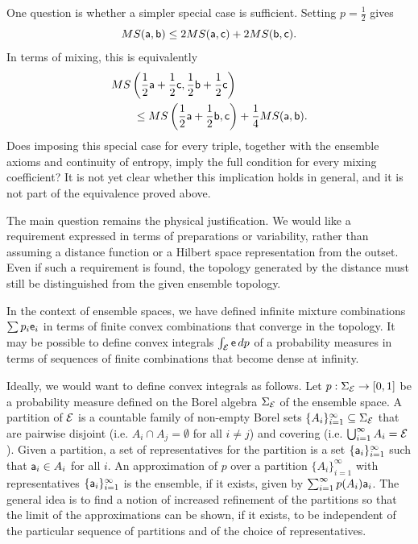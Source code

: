 One question is whether a simpler special case is sufficient. Setting $p=\frac{1}{2}$ gives
\begin{equation}
	MS(\ens[a],\ens[b])\leq2MS(\ens[a],\ens[c])+2MS(\ens[b],\ens[c]).
\end{equation}
In terms of mixing, this is equivalently
\begin{equation}
	\begin{aligned}
		&MS\left(\frac{1}{2}\ens[a]+\frac{1}{2}\ens[c],\frac{1}{2}\ens[b]+\frac{1}{2}\ens[c]\right)\\
		&\qquad\leq MS\left(\frac{1}{2}\ens[a]+\frac{1}{2}\ens[b],\ens[c]\right)+\frac{1}{4}MS(\ens[a],\ens[b]).
	\end{aligned}
\end{equation}
Does imposing this special case for every triple, together with the ensemble axioms and continuity of entropy, imply the full condition for every mixing coefficient? It is not yet clear whether this implication holds in general, and it is not part of the equivalence proved above.

The main question remains the physical justification. We would like a requirement expressed in terms of preparations or variability, rather than assuming a distance function or a Hilbert space representation from the outset. Even if such a requirement is found, the topology generated by the distance must still be distinguished from the given ensemble topology.

{In the context of ensemble spaces, we have defined infinite mixture combinations $\sum p_i \ens_i$ in terms of finite convex combinations that converge in the topology. It may be possible to define convex integrals $\int_{\Ens} \ens \, dp$ of a probability measures in terms of sequences of finite combinations that become dense at infinity.}

Ideally, we would want to define convex integrals as follows. Let $p : \Sigma_{\Ens} \to [0,1]$ be a probability measure defined on the Borel algebra $\Sigma_{\Ens}$ of the ensemble space. A partition of $\Ens$ is a countable family of non-empty Borel sets $\{A_i\}_{i=1}^{\infty} \subseteq \Sigma_{\Ens}$ that are pairwise disjoint (i.e. $A_i \cap A_j = \emptyset$ for all $i \neq j$) and covering (i.e. $\bigcup_{i=1}^{\infty} A_i = \Ens$). Given a partition, a set of representatives for the partition is a set $\{\ens[a]_i\}_{i=1}^{\infty}$ such that $\ens[a]_i \in A_i$ for all $i$. An approximation of $p$ over a partition $\{A_i\}_{i=1}^{\infty}$ with representatives $\{\ens[a]_i\}_{i=1}^{\infty}$ is the ensemble, if it exists, given by $\sum_{i=1}^{\infty} p(A_i) \ens[a]_i$. The general idea is to find a notion of increased refinement of the partitions so that the limit of the approximations can be shown, if it exists, to be independent of the particular sequence of partitions and of the choice of representatives.

